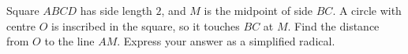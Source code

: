 Square $ABCD$ has side length $2$, and $M$ is the midpoint of side $BC$. A circle with centre $O$ is inscribed in the square, so it touches $BC$ at $M$. Find the distance from $O$ to the line $AM$. Express your answer as a simplified radical.

